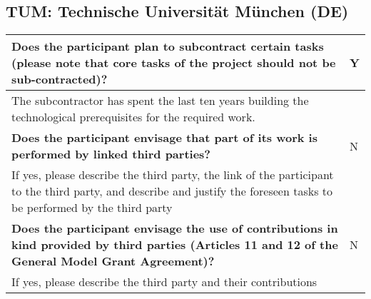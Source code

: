 \subsection{TUM: Technische Universität München (DE)}

\begin{longtable}{|p{}|p{}|}
\hline
{\bf Does the participant plan to subcontract certain tasks (please
  note that core tasks of the project should not be sub-contracted)?}
&
Y
\\
\hline
The subcontractor has spent the last ten years building the technological
prerequisites for the required work. 
&
\\
\hline
{\bf Does the participant envisage that  part of its work is performed
  by linked third parties?}
&
N
\\
\hline
If yes, please describe the third party, the link of the
participant to the third party, and describe and justify the foreseen
tasks to be performed by the third party
&
\\
\hline
{\bf Does the participant envisage the use of contributions in kind
provided by third parties (Articles 11 and 12 of the General Model
Grant Agreement)?}
&
N
\\
\hline
If yes, please describe the third party and their contributions
&
\\
\hline
\end{longtable}



